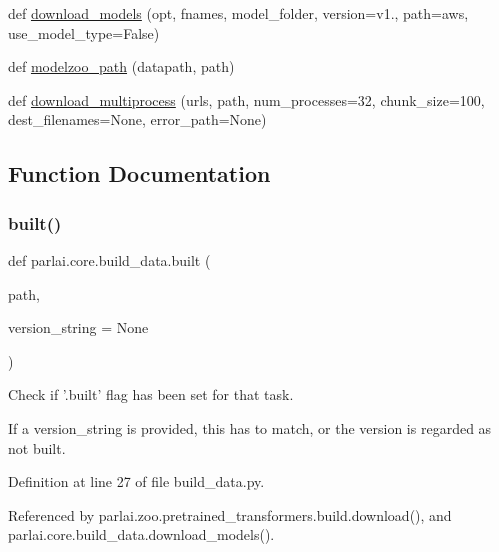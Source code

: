 \begin{DoxyCompactItemize}
def \hyperlink{namespaceparlai_1_1core_1_1build__data_ab697f23f05d3e36d7979fe5e0ed7911e}{download\+\_\+models} (opt, fnames, model\+\_\+folder, version=\textquotesingle{}v1.\textquotesingle{}, path=\textquotesingle{}aws\textquotesingle{}, use\+\_\+model\+\_\+type=False)
\item 
def \hyperlink{namespaceparlai_1_1core_1_1build__data_ad06e9e38ca85db9c4a676ccd9ae41649}{modelzoo\+\_\+path} (datapath, path)
\item 
def \hyperlink{namespaceparlai_1_1core_1_1build__data_ae259aeb321a77560fbcd23028178c897}{download\+\_\+multiprocess} (urls, path, num\+\_\+processes=32, chunk\+\_\+size=100, dest\+\_\+filenames=None, error\+\_\+path=None)
\end{DoxyCompactItemize}


\subsection{Function Documentation}
\mbox{\label{namespaceparlai_1_1core_1_1build__data_ad834e1a9be02e18a6c2de2b03b9a8f10}} 
\subsubsection{\texorpdfstring{built()}{built()}}
{\footnotesize\ttfamily def parlai.\+core.\+build\+\_\+data.\+built (\begin{DoxyParamCaption}\item[{}]{path,  }\item[{}]{version\+\_\+string = {\ttfamily None} }\end{DoxyParamCaption})}

\begin{DoxyVerb}Check if '.built' flag has been set for that task.

If a version_string is provided, this has to match, or the version
is regarded as not built.
\end{DoxyVerb}
 

Definition at line 27 of file build\+\_\+data.\+py.



Referenced by parlai.\+zoo.\+pretrained\+\_\+transformers.\+build.\+download(), and parlai.\+core.\+build\+\_\+data.\+download\+\_\+models().

